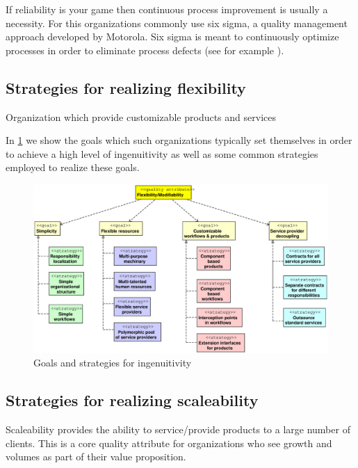 \documentclass[11pt,english,a4]{article}
\begin{document}
If reliability is your game then continuous process improvement is usually a necessity. For this organizations commonly use six sigma, a quality management approach developed by Motorola. Six sigma is meant to continuously optimize processes in order to eliminate process defects (see for example \cite{Pande-Neumann-Cavanaugh-2000}).

\subsection{Strategies for realizing flexibility}

Organization which provide customizable products and services

In \ref{flexibilityTactics_fig} we show the goals which such organizations typically set themselves in order to achieve a high level of ingenuitivity as well as some common strategies employed to realize these goals.

\begin{figure}[hbt]
  \begin{center}
    \includegraphics[scale=0.4]{flexibilityTactics}
    \caption{Goals and strategies for ingenuitivity}\label{flexibilityTactics_fig}
  \end{center}
\end{figure}

\subsection{Strategies for realizing scaleability}

Scaleability provides the ability to service/provide products to a large number of clients. This is a core quality attribute for organizations who see growth and volumes as part of their value proposition.
\end{document}
